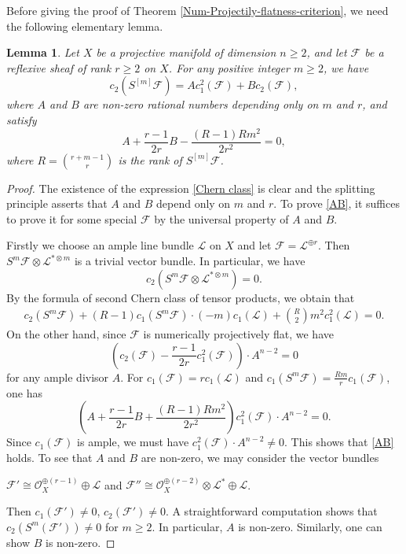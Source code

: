 \documentclass[english,reqno]{amsart}
\newcommand\sF{{\mathscr F}}
\newcommand\sL{{\mathscr L}}
\newcommand\sO{{\mathscr O}}
\theoremstyle{plain}
\newtheorem{lemma}[thm]{Lemma}
\theoremstyle{definition}
\numberwithin{equation}{section} %
\begin{document}
\noindent Before giving the  proof of Theorem \ref{Num-Projectily-flatness-criterion},  we need the following elementary lemma.


\begin{lemma}\label{Chern-class-symmetric-power}
    Let $X$ be a projective manifold of dimension $n\geqslant 2$, and let $\sF$ be a reflexive   sheaf of rank $r\geqslant 2$ on $X$. For any positive integer $m\geqslant 2$, we have
    \begin{equation}\label{Chern class}
    c_2(S^{[m]}\sF)=Ac_1^2(\sF)+Bc_2(\sF),
    \end{equation}
    where $A$ and $B$ are non-zero rational numbers  depending only on $m$ and $r$, and satisfy
    \begin{equation}\label{AB}
    A+\frac{r-1}{2r}B-\frac{(R-1)Rm^2}{2r^2}=0,
    \end{equation}
    where $R=\binom{r+m-1}{r}$ is the rank of $S^{[m]}\sF$.
\end{lemma}

\begin{proof}
    The existence of the expression \eqref{Chern class} is clear and the splitting principle asserts that $A$ and $B$ depend only on $m$ and $r$. To prove \eqref{AB}, it suffices to prove it for some special $\sF$ by the universal property of $A$ and $B$.

    Firstly we choose an ample line bundle $\sL$ on $X$ and let $\sF=\sL^{\oplus r}$. Then   $S^m\sF\otimes\sL^{*\otimes m}$ is a trivial  vector bundle. In particular, we have
    \[
    c_2(S^m\sF\otimes \sL^{*\otimes m})=0.
    \]
    By the formula of second Chern class of tensor products, we obtain that
    \begin{align*}
    c_2(S^m\sF)+(R-1)c_1(S^m\sF)\cdot (-m)c_1(\sL)+\binom{R}{2}m^2c_1^2(\sL)=0.
    \end{align*}
    On the other hand, since $\sF$ is numerically projectively flat,  we  have
    \[\left(c_2(\sF)-\frac{r-1}{2r}c_1^2(\sF)\right)\cdot A^{n-2}=0\]
    for any ample divisor $A$.  For $c_1(\sF)=rc_1(\sL)$ and $c_1(S^m\sF)=\frac{Rm}{r}c_1(\sF)$, one has
    \[\left(A+\frac{r-1}{2r}B+\frac{(R-1)Rm^2}{2r^2}\right)c_1^2(\sF)\cdot A^{n-2}=0.\]
    Since $c_1(\sF)$ is ample, we must have $c_1^2(\sF)\cdot A^{n-2}\not=0$. This shows that \eqref{AB} holds. To see that $A$ and $B$ are non-zero, we may consider the vector bundles
    \begin{center}
        $\sF'\cong  \sO_X^{\oplus (r-1)}\oplus \sL$ and $\sF''\cong
        \sO_{X}^{\oplus (r-2)}\otimes \sL^*\oplus\sL$.
    \end{center}
    Then $c_1(\sF')\not=0$, $c_2(\sF')\not=0$. A straightforward computation shows that   $c_2(S^m(\sF'))\not=0$ for $m\geqslant 2$. In particular, $A$ is non-zero. Similarly,  one can show $B$ is non-zero.
\end{proof}
\end{document}
